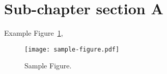 \section{Sub-chapter section A}
\label{section:example-sectionA}

Example Figure~\ref{fig:sample-figure},

\begin{figure}[!ht]
  \centering
  \texttt{[image: sample-figure.pdf]}
  \caption{Sample Figure.}
  \label{fig:sample-figure}
\end{figure}